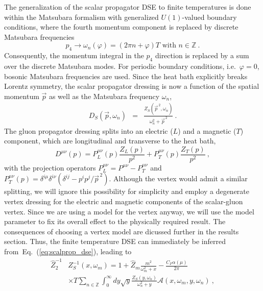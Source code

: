\documentclass[final,twocolumn,merge,sort&compress]{elsarticle}
\def\Eq#1{Eq.~(\ref{#1})}
\begin{document}
The generalization of the scalar propagator DSE to finite temperatures
is done within the Matsubara formalism with generalized $U(1)$-valued
boundary conditions, where the fourth momentum component is replaced
by discrete Matsubara frequencies
\begin{equation}
p_4\rightarrow \omega_n (\varphi)= (2\pi n +\varphi )T \text { with }
n \in \mathbb{Z}\ .
\end{equation}
Consequently, the momentum integral in the $p_4$ direction is
replaced by a sum over the discrete Matsubara modes. For periodic
boundary conditions, i.e.\ $\varphi = 0$, bosonic Matsubara
frequencies are used. Since the heat bath explicitly breaks Lorentz
symmetry, the scalar propagator dressing is now a function of the
spatial momentum $\vec{p}$ as well as the Matsubara frequency
$\omega_n$,
\begin{eqnarray}
\label{eq:prop_dressings_T}
  D_S(\vec{p}, \omega_n) & = & \frac{Z_S(\vec{p}^{\,2},\omega_n)}
  {\omega_n^2 + \vec{p}^{\,2}} \ .
\end{eqnarray}
The gluon propagator dressing splits into an electric ($L$) and a
magnetic ($T$) component, which are longitudinal and transverse to the
heat bath,
\begin{equation}
\label{eq:gluonprop_dressings_T}
D^{\mu\nu}(p) = P^{\mu\nu}_L(p)\frac{Z_L(p)}{p^2} + P^{\mu\nu}_T (p)\frac{Z_T(p)}{p^2} \ ,
\end{equation}
with the projection operators $P^{\mu\nu}_L = P^{\mu\nu}-P^{\mu\nu}_T$
and
$P^{\mu\nu}_T(p) = \delta^{i\mu}\delta^{i\nu} \left(\delta^{ij}-{p^i
    p^j}/{\vec{p}^{\,2}}\right)$.  Although the vertex would admit a
similar splitting, we will ignore this possibility for simplicity and
employ a degenerate vertex dressing for the electric and magnetic
components of the scalar-gluon vertex. Since we are using a model
for the vertex anyway, we will use the model parameter to fix its overall
effect to the physically required result. The consequences of choosing a vertex
model are dicussed further in the results section. Thus, the finite temperature
DSE can immediately be inferred from~\Eq{eq:scalprop_dse}, leading to
\begin{equation}
\label{eq:scaldress_dse_T}
\begin{split}
  \hat{Z}_2^{-1} &Z_S^{-1}(x,\omega_m) =
  1+\hat{Z}_m\frac{m^2}{\omega_m^2+x}
  -\frac{C_F \alpha(\mu)}{2\pi} \\
  & \times T\sum\limits_{n\in\mathbb{Z}}\int_{0}^\infty \!\! dy\sqrt{y}\frac{Z_S(y,\omega_n)}{\omega_n^2+y} \mathcal{A}(x,\omega_m,y,\omega_n)  \ , \\
\end{split}
\end{equation}
\end{document}
